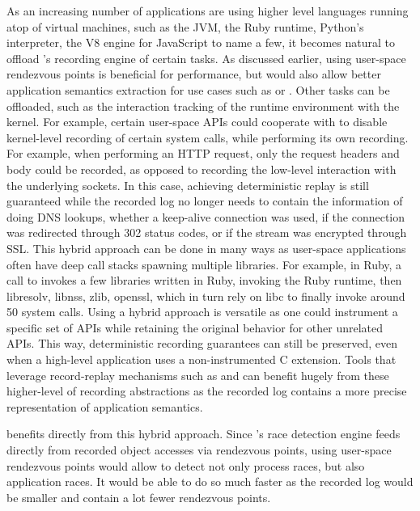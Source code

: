 As an increasing number of applications are using higher level languages running
atop of virtual machines, such as the JVM, the Ruby runtime, Python's interpreter,
the V8 engine for JavaScript to name a few, it becomes natural to offload \scribe's
recording engine of certain tasks. As discussed earlier, using user-space
rendezvous points is beneficial for performance, but would also allow
better application semantics extraction for use cases such as \racepro or \dora.
Other tasks can be offloaded, such as the interaction tracking of the runtime
environment with the kernel. For example, certain user-space APIs could cooperate
with \scribe to disable kernel-level recording of certain system calls, while performing
its own recording. For example, when performing an HTTP request, only the request
headers and body could be recorded, as opposed to recording the low-level
interaction with the underlying sockets. In this case, achieving deterministic
replay is still guaranteed while the recorded log no longer needs to contain the
information of doing DNS lookups, whether a keep-alive connection was used, if
the connection was redirected through 302 status codes, or if the stream was
encrypted through SSL.
This hybrid approach can be done in many ways as user-space applications often
have deep call stacks spawning multiple libraries. For example, in Ruby, a call
to  invokes a few libraries written
in Ruby, invoking the Ruby runtime, then libresolv, libnss, zlib, openssl, which
in turn rely on libc to finally invoke around 50 system calls.
Using a hybrid approach is versatile as one could instrument a specific set of APIs
while retaining the original \scribe behavior for other unrelated APIs. This way,
deterministic recording guarantees can still be preserved, even when a high-level
application uses a non-instrumented C extension.
Tools that leverage record-replay mechanisms such as \dora and \racepro can
benefit hugely from these higher-level of recording abstractions as the
recorded log contains a more precise representation of application semantics.

\racepro benefits directly from this hybrid approach. Since \racepro's race
detection engine feeds directly from recorded object accesses via rendezvous points,
using user-space rendezvous points would allow \racepro to detect not only process
races, but also application races. It would be able to do so much faster
as the recorded log would be smaller and contain a lot fewer rendezvous points.

